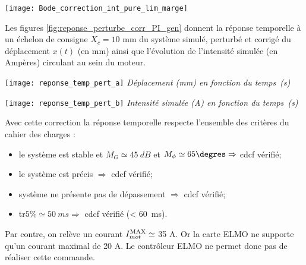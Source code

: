 \begin{multicols}{2}
\begin{corrige}
 
\begin{center}
       \texttt{[image: Bode\_correction\_int\_pure\_lim\_marge]}

 \end{center} 

\end{corrige}
\fi

\ifprof
\else
\vspace{1em}
Les figures \ref{fig:reponse_perturbe_corr_PI_gen} donnent la réponse temporelle à un échelon de consigne $X_c = 10$ mm du système simulé, perturbé et corrigé du déplacement $x(t)$ (en mm)  ainsi que l'évolution de l'intensité simulée (en Ampères) circulant au sein du moteur.

\begin{center}
\texttt{[image: reponse\_temp\_pert\_a]}
\textit{Déplacement (mm) en fonction du temps~(s)}

\texttt{[image: reponse\_temp\_pert\_b]}
\textit{Intensité simulée (A) en fonction du temps~(s)}

\end{center}

\fi




\ifprof
\begin{corrige}
Avec cette correction la réponse temporelle respecte l'ensemble des critères du cahier des charges :\\
\begin{itemize}
\item le système est stable et $M_G \simeq \SI{45}{dB}$ et $M_{\phi} \simeq 65\degres  \Rightarrow $ cdcf vérifié;
\item le système est précis $ \Rightarrow $ cdcf vérifié;
\item système ne présente pas de dépassement $ \Rightarrow $ cdcf vérifié;
\item tr$5\% \simeq \SI{50}{ms}  \Rightarrow $ cdcf vérifié (< \SI{60}{ms}).
\end{itemize}
Par contre, on relève un courant $I_{mot}^{\text{\text{MAX}}} \simeq$ 35 A. Or la carte ELMO ne supporte qu'un courant maximal de 20 A. Le contrôleur ELMO ne permet donc pas de réaliser cette commande. 



\end{corrige}
\end{multicols}
